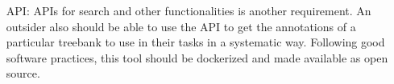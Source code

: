 \begin{itemize}[before=\normalfont, font=\itshape, align=left]
\item[API:]
APIs for search and other functionalities is another requirement.
An outsider also should be able to use the API to get the annotations of a particular treebank to use in their tasks in a systematic way.
Following good software practices, this tool should be dockerized and made available as open source.
\end{itemize}
